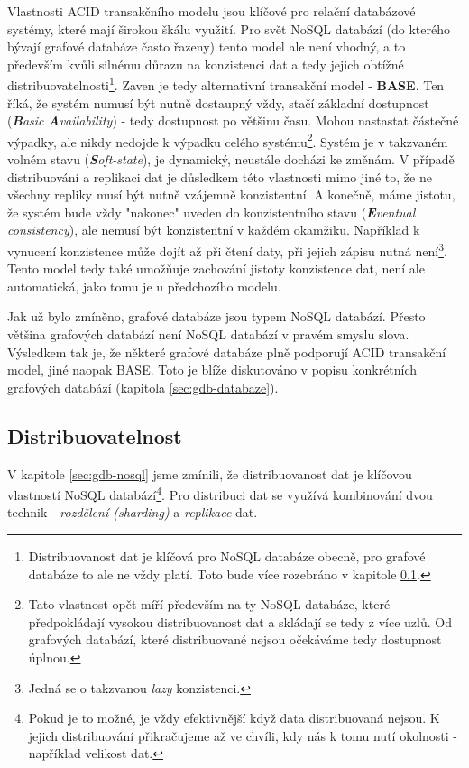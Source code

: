 Vlastnosti ACID transakčního modelu jsou klíčové pro relační databázové systémy, které mají širokou škálu využití. Pro svět NoSQL databází (do kterého bývají grafové databáze často řazeny) tento model ale není vhodný, a to především kvůli silnému důrazu na konzistenci dat a tedy jejich obtížné distribuovatelnosti\footnote{Distribuovanost dat je klíčová pro NoSQL databáze obecně, pro grafové databáze to ale ne vždy platí. Toto bude více rozebráno v kapitole \ref{sec:gdb-distribution}.}. Zaven je tedy alternativní transakční model - \textbf{BASE}. Ten říká, že systém numusí být nutně dostaupný vždy, stačí základní dostupnost (\textit{\textbf{B}asic \textbf{A}vailability}) - tedy dostupnost po většinu času. Mohou nastastat částečné výpadky, ale nikdy nedojde k výpadku celého systému\footnote{Tato vlastnost opět míří především na ty NoSQL databáze, které předpokládají vysokou distribuovanost dat a skládají se tedy z více uzlů. Od grafových databází, které distribuované nejsou očekáváme tedy dostupnost úplnou.}. Systém je v takzvaném volném stavu (\textit{\textbf{S}oft-state}), je dynamický, neustále docházi ke změnám. V případě distribuování a replikaci dat je důsledkem této vlastnosti mimo jiné to, že ne všechny repliky musí být nutně vzájemně konzistentní. A konečně, máme jistotu, že systém bude vždy "nakonec" uveden do konzistentního stavu (\textit{\textbf{E}ventual consistency}), ale nemusí být konzistentní v každém okamžiku. Například k vynucení konzistence může dojít až při čtení daty, při jejich zápisu nutná není\footnote{Jedná se o takzvanou \textit{lazy} konzistenci.}. Tento model tedy také umožňuje zachování jistoty konzistence dat, není ale automatická, jako tomu je u předchozího modelu. \cite{Sadalage13}

Jak už bylo zmíněno, grafové databáze jsou typem NoSQL databází. Přesto většina grafových databází není NoSQL databází v pravém smyslu slova. Výsledkem tak je, že některé grafové databáze plně podporují ACID transakční model, jiné naopak BASE. Toto je blíže diskutováno v popisu konkrétních grafových databází (kapitola \ref{sec:gdb-databaze}).



\subsection{Distribuovatelnost}
\label{sec:gdb-distribution}
V kapitole \ref{sec:gdb-nosql} jsme zmínili, že distribuovanost dat je klíčovou vlastností NoSQL databází\footnote{Pokud je to možné, je vždy efektivnější když data distribuovaná nejsou. K jejich distribuování přikračujeme až ve chvíli, kdy nás k tomu nutí okolnosti - například velikost dat.}. Pro distribuci dat se využívá kombinování dvou technik - \textit{rozdělení (sharding)} a \textit{replikace} dat. 

